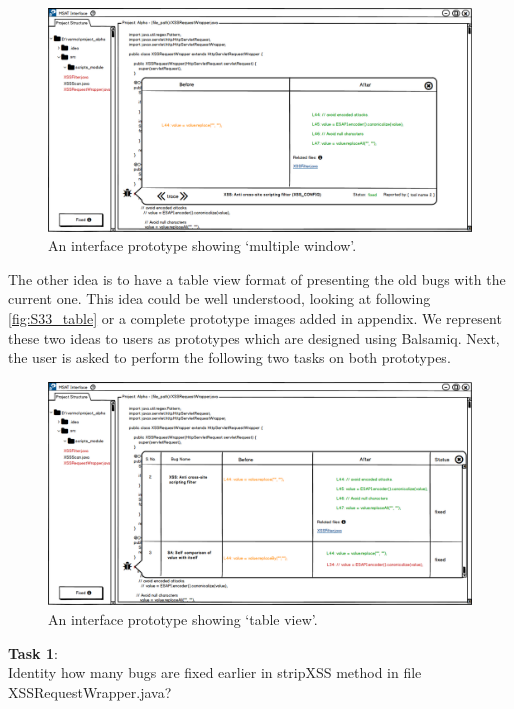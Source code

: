 \begin{figure}[hbt!]
	\centering
	\includegraphics[width=\linewidth]{figures/solution_ideas_snaps/S33_multiple}
	\caption{An interface prototype showing ‘multiple window’.}
	\label{fig:S33_multiple}
\end{figure}

The other idea is to have a table view format of presenting the old bugs with the current one. This idea could be well understood, looking at following \autoref{fig:S33_table} or a complete prototype images added in appendix. We represent these two ideas to users as prototypes which are designed using Balsamiq. Next, the user is asked to perform the following two tasks on both prototypes. \\

\begin{figure}[hbt!]
	\centering
	\includegraphics[width=\linewidth]{figures/solution_ideas_snaps/S33_table}
	\caption{An interface prototype showing ‘table view’.}
	\label{fig:S33_table}
\end{figure}

\textbf{Task 1}: \\ 

Identity how many bugs are fixed earlier in stripXSS method in file XSSRequestWrapper.java? \\ \\

